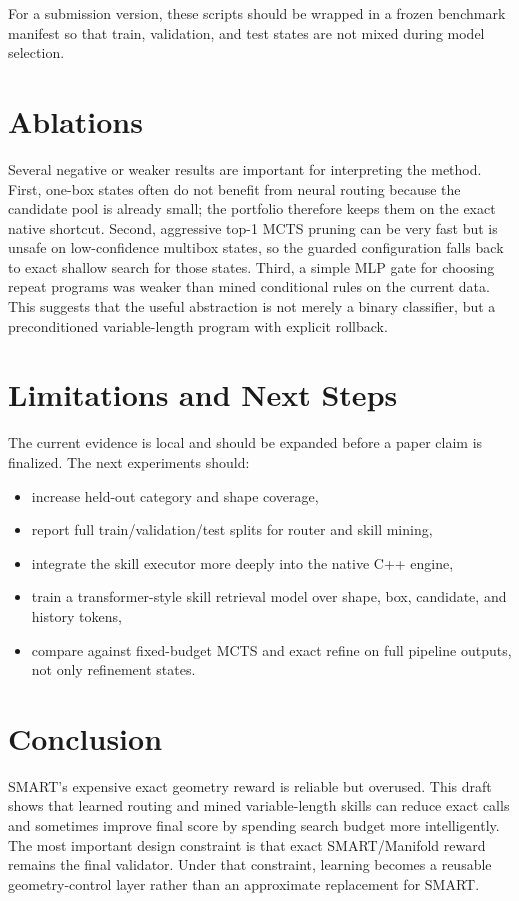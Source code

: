 \documentclass[10pt,twocolumn,letterpaper]{article}
\begin{document}
For a submission version, these scripts should be wrapped in a frozen benchmark
manifest so that train, validation, and test states are not mixed during model
selection.

\section{Ablations}

Several negative or weaker results are important for interpreting the method.
First, one-box states often do not benefit from neural routing because the
candidate pool is already small; the portfolio therefore keeps them on the
exact native shortcut.  Second, aggressive top-1 MCTS pruning can be very fast
but is unsafe on low-confidence multibox states, so the guarded configuration
falls back to exact shallow search for those states.  Third, a simple MLP gate
for choosing repeat programs was weaker than mined conditional rules on the
current data.  This suggests that the useful abstraction is not merely a binary
classifier, but a preconditioned variable-length program with explicit rollback.

\section{Limitations and Next Steps}

The current evidence is local and should be expanded before a paper claim is
finalized.  The next experiments should:

\begin{itemize}
\item increase held-out category and shape coverage,
\item report full train/validation/test splits for router and skill mining,
\item integrate the skill executor more deeply into the native C++ engine,
\item train a transformer-style skill retrieval model over shape, box,
candidate, and history tokens,
\item compare against fixed-budget MCTS and exact refine on full pipeline
outputs, not only refinement states.
\end{itemize}

\section{Conclusion}

SMART's expensive exact geometry reward is reliable but overused.  This draft
shows that learned routing and mined variable-length skills can reduce exact
calls and sometimes improve final score by spending search budget more
intelligently.  The most important design constraint is that exact
SMART/Manifold reward remains the final validator.  Under that constraint,
learning becomes a reusable geometry-control layer rather than an approximate
replacement for SMART.

{\small


}
\end{document}
